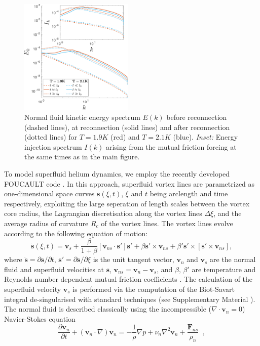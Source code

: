 \documentclass[%
 reprint,
 amsmath,amssymb,
 aps,
 prl,
]{revtex4-2}
\def \s{\mathbf{s}}
\def \v{\mathbf{v}}
\begin{document}
{\begin{figure}[b]
    \centering
    \includegraphics*[width=0.48\textwidth]{energy-spec.pdf}
    \caption{Normal fluid kinetic energy spectrum $E(k)$ before 
reconnection (dashed lines), at reconnection (solid lines) 
and after reconnection (dotted lines) for $T=1.9K$ (red)
and $T=2.1K$ (blue). 
\emph{Inset:} Energy injection spectrum $I(k)$ arising from the 
mutual friction forcing at the same times as in the main figure.}
    \label{fig:kinetic-energy}
\end{figure}

To model superfluid helium dynamics, we employ 
the recently developed FOUCAULT code
\cite{galantucciNewSelfconsistentApproach2020b}. 
In this approach, superfluid vortex lines are
parametrized as one-dimensional space curves 
$\s(\xi,t)$, $\xi$ and $t$ being arclength and time respectively, 
exploiting the large seperation of length scales between the vortex core radius, 
the Lagrangian discretisation along the vortex lines $\Delta\xi$,
and the average radius of curvature $R_c$ of the vortex lines. 
The vortex lines evolve according to the following equation of motion:
\begin{equation}
    \dot{\s}(\xi,t) = \v_s + \frac{\beta}{1+\beta}\left[\v_{ns}\cdot\s'\right]\s' + \beta\s'\times\v_{ns} + \beta'\s'\times\left[\s'\times\v_{ns}\right],
\end{equation}
where $\dot{\s} = \partial\s/\partial t$, $\s' = \partial\s/\partial\xi$ is the unit tangent vector, $\v_n$ and $\v_s$ are the normal fluid and superfluid velocities at $\s$, $\v_{ns} = \v_n-\v_s$, and $\beta,\, \beta'$ are temperature and Reynolds number dependent mutual friction coefficients \cite{galantucciNewSelfconsistentApproach2020b}. The calculation of the superfluid velocity $\v_s$ is performed via the computation of the Biot-Savart integral de-singularised with standard techniques (see Supplementary Material \cite{suppMat}). The normal fluid is described classically using the incompressible ($\nabla\cdot\v_n=0$) 
Navier-Stokes equation
\begin{equation}
    \frac{\partial\v_n}{\partial t} + (\v_n\cdot\nabla)\v_n = -\frac{1}{\rho}\nabla p  + \nu_n\nabla^2\v_n + \frac{\mathbf{F}_{ns}}{\rho_n} \; \; , 
\end{equation}

}
\end{document}
